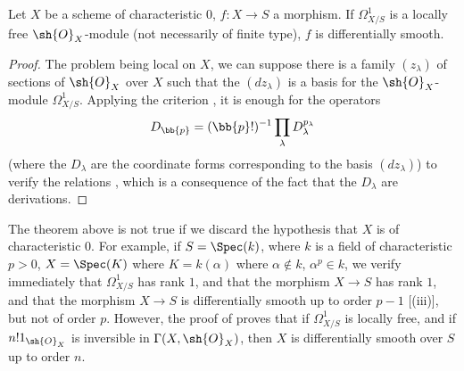 \begin{theorem}[16.12.2]
\label{IV.16.12.2}
Let $X$ be a scheme of characteristic $0$, $f:X \to S$ a morphism.
If $\Omega_{X/S}^1$ is a locally free $\sh{O}_X$-module (not necessarily of finite type), $f$ is differentially smooth.
\end{theorem}

\begin{proof}
The problem being local on $X$, we can suppose there is a family $(z_\lambda)$ of sections of $\sh{O}_X$ over $X$ such that the $(dz_\lambda)$ is a basis for the $\sh{O}_X$-module $\Omega_{X/S}^1$.
Applying the criterion , it is enough for the operators 
\[
  D_\bb{p} = (\bb{p}!)^{-1} \prod_\lambda D_\lambda^{p_\lambda}
\]
(where the $D_\lambda$ are the coordinate forms corresponding to the basis $(dz_\lambda)$) to verify the relations , which is a consequence of the fact that the $D_\lambda$ are derivations.
\end{proof}

\begin{env}[16.12.3]
\label{IV.16.12.3}
The theorem above is not true if we discard the hypothesis that $X$ is of characteristic $0$.
For example, if $S = \Spec(k)$, where $k$ is a field of characteristic $p > 0$, $X = \Spec(K)$ where $K = k(\alpha)$ where $\alpha \notin k$, $\alpha^p \in k$, we verify immediately 
that $\Omega_{X/S}^1$ has rank $1$, and that the morphism $X \to S$ has rank $1$, and that the morphism $X \to S$ is differentially smooth up to order $p - 1$ [(iii)], but not of order $p$.
However, the proof of  proves that if $\Omega_{X/S}^1$ is locally free, and if $n! 1_{\sh{O}_X}$ is inversible in $\Gamma(X, \sh{O}_X)$, then $X$ is differentially smooth over $S$ up to order $n$.
\end{env}
